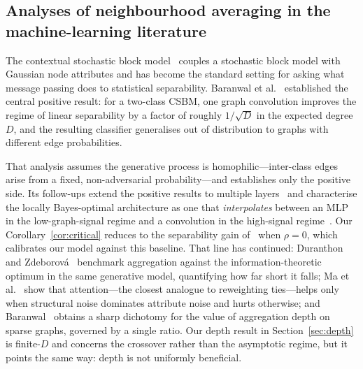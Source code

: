 \documentclass[onecolumn,pdflatex,sn-basic,Numbered]{sn-jnl}
\theoremstyle{thmstyleone}
\theoremstyle{thmstylethree}
\begin{document}
\subsection{Analyses of neighbourhood averaging in the machine-learning literature}


The contextual stochastic block model~\citep{deshpande2018contextual} couples a
stochastic block model with Gaussian node attributes and has become the standard
setting for asking what message passing does to statistical separability. Baranwal
et al.~\citep{baranwal2021graph} established the central positive result: for a
two-class CSBM, one graph convolution improves the regime of linear separability by
a factor of roughly $1/\sqrt{D}$ in the expected degree $D$, and the resulting
classifier generalises out of distribution to graphs with different edge
probabilities.

That analysis assumes the generative process is homophilic---inter-class edges arise
from a fixed, non-adversarial probability---and establishes only the positive side.
Its follow-ups extend the positive results to multiple
layers~\citep{baranwal2023effects} and characterise the locally Bayes-optimal
architecture as one that \emph{interpolates} between an MLP in the low-graph-signal
regime and a convolution in the high-signal regime~\citep{baranwal2023optimality}.
Our Corollary~\ref{cor:critical} reduces to the separability gain
of~\citet{baranwal2021graph} when $\rho = 0$, which calibrates our model against this
baseline. That line has continued: Duranthon and
Zdeborov\'a~\citep{duranthon2025statistical} benchmark aggregation against the
information-theoretic optimum in the same generative model, quantifying how far short it
falls; Ma et al.~\citep{ma2025attention} show that attention---the closest
analogue to reweighting ties---helps only when structural noise dominates attribute
noise and hurts otherwise; and Baranwal~\citep{baranwal2026depth} obtains a sharp
dichotomy for the value of aggregation depth on sparse graphs, governed by a single
ratio. Our depth result in Section~\ref{sec:depth} is finite-$D$ and concerns the
crossover rather than the asymptotic regime, but it points the same way: depth is not
uniformly beneficial.
\end{document}
